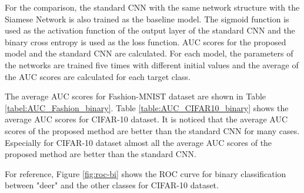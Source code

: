 \documentclass[runningheads,a4paper]{llncs}
\begin{document}
For the comparison, the standard CNN with the same network structure with the Siamese Network is also trained as the baseline model.
The sigmoid function is used as the activation function of the output layer of the standard CNN and the binary cross entropy is used as the loss function.
AUC scores for the proposed model and the standard CNN are calculated.
For each model, the parameters of the networks are trained five times with different initial values and the average of the AUC scores are calculated for each target class.

The average AUC scores for Fashion-MNIST dataset are shown in Table \ref{tabel:AUC_Fashion_binary}.
Table \ref{table:AUC_CIFAR10_binary} shows the average AUC scores for CIFAR-10 dataset.
It is noticed that the average AUC scores of the proposed method are better than the standard CNN for many cases.
Especially for CIFAR-10 dataset almost all the average AUC scores of the proposed method are better than the standard CNN. 






For reference, Figure \ref{fig:roc-bi} shows the ROC curve for binary classification between "deer" and the other classes for CIFAR-10 dataset.
\end{document}
